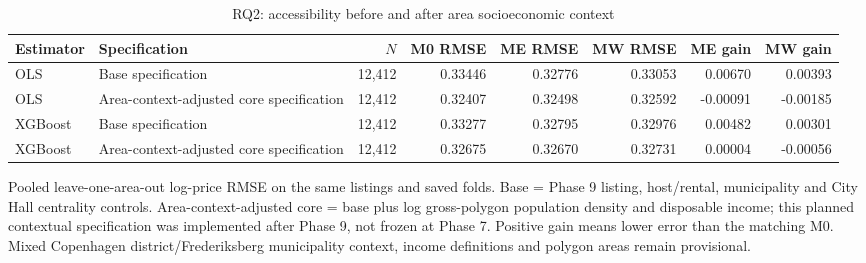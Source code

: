 \begin{landscape}
\begin{table}[p]
\centering
\small
\begin{threeparttable}
\caption{RQ2: accessibility before and after area socioeconomic context}\label{tab:rq2-area-context}
\begin{tabular}{>{\raggedright\arraybackslash}p{2.0cm}>{\raggedright\arraybackslash}p{6.0cm}rrrrrr}
\toprule
Estimator & Specification & $N$ & M0 RMSE & ME RMSE & MW RMSE & ME gain & MW gain \\
\midrule
OLS & Base specification & 12,412 & 0.33446 & 0.32776 & 0.33053 & 0.00670 & 0.00393 \\
OLS & Area-context-adjusted core specification & 12,412 & 0.32407 & 0.32498 & 0.32592 & -0.00091 & -0.00185 \\
XGBoost & Base specification & 12,412 & 0.33277 & 0.32795 & 0.32976 & 0.00482 & 0.00301 \\
XGBoost & Area-context-adjusted core specification & 12,412 & 0.32675 & 0.32670 & 0.32731 & 0.00004 & -0.00056 \\
\bottomrule
\end{tabular}
\begin{tablenotes}[flushleft]\footnotesize
\item Pooled leave-one-area-out log-price RMSE on the same listings and saved folds. Base = Phase 9 listing, host/rental, municipality and City Hall centrality controls. Area-context-adjusted core = base plus log gross-polygon population density and disposable income; this planned contextual specification was implemented after Phase 9, not frozen at Phase 7. Positive gain means lower error than the matching M0. Mixed Copenhagen district/Frederiksberg municipality context, income definitions and polygon areas remain provisional.
\end{tablenotes}
\end{threeparttable}
\end{table}
\end{landscape}

